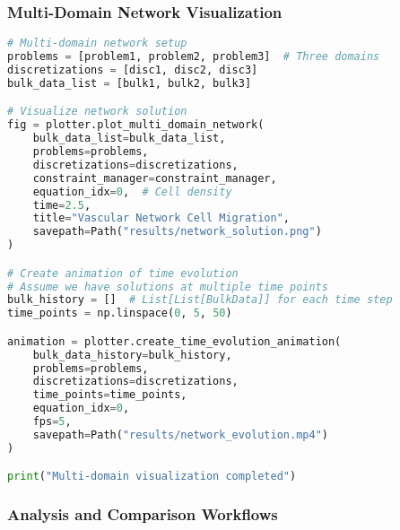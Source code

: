 \subsubsection{Multi-Domain Network Visualization}

\begin{lstlisting}[language=Python, caption=Expected Multi-Domain Usage]
# Multi-domain network setup
problems = [problem1, problem2, problem3]  # Three domains
discretizations = [disc1, disc2, disc3]
bulk_data_list = [bulk1, bulk2, bulk3]

# Visualize network solution
fig = plotter.plot_multi_domain_network(
    bulk_data_list=bulk_data_list,
    problems=problems,
    discretizations=discretizations,
    constraint_manager=constraint_manager,
    equation_idx=0,  # Cell density
    time=2.5,
    title="Vascular Network Cell Migration",
    savepath=Path("results/network_solution.png")
)

# Create animation of time evolution
# Assume we have solutions at multiple time points
bulk_history = []  # List[List[BulkData]] for each time step
time_points = np.linspace(0, 5, 50)

animation = plotter.create_time_evolution_animation(
    bulk_data_history=bulk_history,
    problems=problems,
    discretizations=discretizations,
    time_points=time_points,
    equation_idx=0,
    fps=5,
    savepath=Path("results/network_evolution.mp4")
)

print("Multi-domain visualization completed")
\end{lstlisting}

\subsubsection{Analysis and Comparison Workflows}

